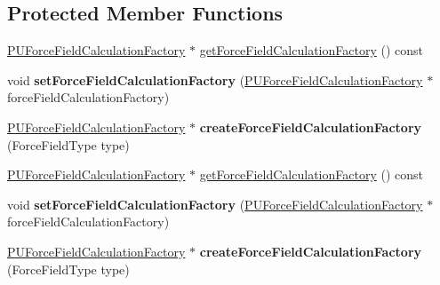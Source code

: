 \subsection*{Protected Member Functions}
\begin{DoxyCompactItemize}
\item 
\hyperlink{classPUForceFieldCalculationFactory}{P\+U\+Force\+Field\+Calculation\+Factory} $\ast$ \hyperlink{classPUForceField_a28bfa6cef242f99bc9c6f38166583da3}{get\+Force\+Field\+Calculation\+Factory} () const
\item 
\mbox{\label{classPUForceField_afa1f3262163cdc4d31684920dcc28d28}} 
void {\bfseries set\+Force\+Field\+Calculation\+Factory} (\hyperlink{classPUForceFieldCalculationFactory}{P\+U\+Force\+Field\+Calculation\+Factory} $\ast$force\+Field\+Calculation\+Factory)
\item 
\mbox{\label{classPUForceField_ab4917dea93adb2647d2b45986aa057d4}} 
\hyperlink{classPUForceFieldCalculationFactory}{P\+U\+Force\+Field\+Calculation\+Factory} $\ast$ {\bfseries create\+Force\+Field\+Calculation\+Factory} (Force\+Field\+Type type)
\item 
\hyperlink{classPUForceFieldCalculationFactory}{P\+U\+Force\+Field\+Calculation\+Factory} $\ast$ \hyperlink{classPUForceField_a8c68ee8a2599b197f50dbfcaf887e7c2}{get\+Force\+Field\+Calculation\+Factory} () const
\item 
\mbox{\label{classPUForceField_afa1f3262163cdc4d31684920dcc28d28}} 
void {\bfseries set\+Force\+Field\+Calculation\+Factory} (\hyperlink{classPUForceFieldCalculationFactory}{P\+U\+Force\+Field\+Calculation\+Factory} $\ast$force\+Field\+Calculation\+Factory)
\item 
\mbox{\label{classPUForceField_a0f66e969f5eb8fac4cf0f2130991a510}} 
\hyperlink{classPUForceFieldCalculationFactory}{P\+U\+Force\+Field\+Calculation\+Factory} $\ast$ {\bfseries create\+Force\+Field\+Calculation\+Factory} (Force\+Field\+Type type)
\end{DoxyCompactItemize}
